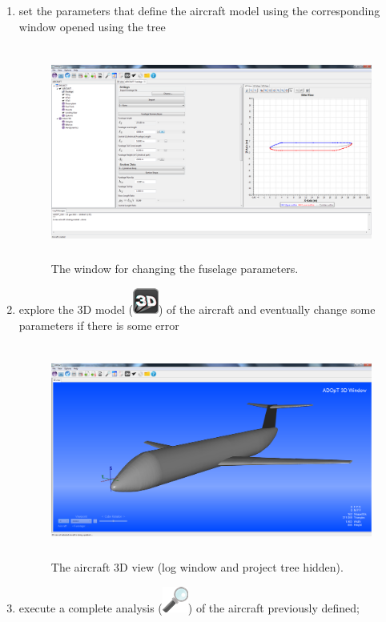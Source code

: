 \begin{enumerate}
\item set the parameters that define the aircraft model using the corresponding window opened using the tree
\begin{figure}[H]
		\centering
		\includegraphics[height = 7cm]{Immagini/gui/changeFusParam.png}
		\caption{The window for changing the fuselage parameters.}
	\end{figure}
\item explore the 3D model \big(\includegraphics[scale=1.2]{Immagini/gui/icons/3DView_32x32.png}\big) of the aircraft and eventually change some parameters if there is some error
		\begin{figure}[H]
	\centering
		\includegraphics[height =7cm]{Immagini/gui/cad1.png}
		\caption{The aircraft 3D view (log window and project tree hidden).}
	\end{figure}
\item execute a complete analysis \big(\includegraphics[scale=0.5]{Immagini/gui/icons/analysis_32x32.png}\big) of the aircraft previously defined;


\end{enumerate}
